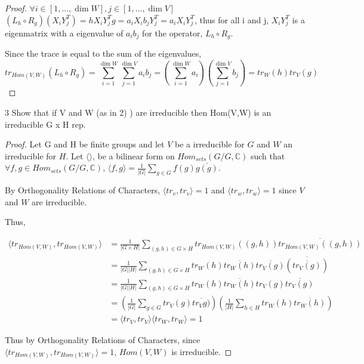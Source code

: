 \documentclass{article}
\newcommand{\C}{\mathbb{C}}
\newcommand{\angles}[1]{\langle #1 \rangle}
\begin{document}
\begin{proof}
    
    $\forall i \in [1, ..., \dim W] , j \in [1, \dots, \dim V]$ $(L_h \circ R_g)(X_i Y_j^T) = hX_iY_j^Tg = a_iX_ib_jY_j^T = a_iX_iY_j^T$, thus for all i and j, $X_iY_j^T$ is a eigenmatrix with a eigenvalue of $a_ib_j$ for the operator, $L_h \circ R_g$.
    
    Since the trace is equal to the sum of the eigenvalues, 
    \[
        tr_{Hom(V, W)}(L_h \circ R_g) = \sum_{i = 1}^{\dim W} \sum_{j = 1}^{\dim V} a_ib_j = \left(\sum_{i = 1}^{\dim W} a_i \right) \left(\sum_{j = 1}^{\dim V} b_j\right) = tr_W(h) tr_V(g)
    \]
\end{proof}

\bigskip

\begin{PROB}{3}\label{Problem 3.}
    Show that if V and W (as in 2) ) are irreducible then Hom(V,W) is an irreducible G x H rep.
\end{PROB}
\begin{proof}
    Let G and H be finite groups and let $V$ be a irreducible for $G$ and $W$ an irreducible for $H$. Let $\angles{}$, be a bilinear form on $Hom_{sets}(G / G, \C)$ such that $\forall f, g \in Hom_{sets}(G / G, \C)$, $\angles{f, g} = \frac{1}{|G|} \sum_{g \in G} f(g) \bar{g(g)}$.

    By Orthogonality Relations of Characters, $\angles{tr_v, tr_v} = 1$ and $\angles{tr_w, tr_w} = 1$ since $V$ and $W$ are irreducible. 

    Thus, 
    
    \begin{align*}
        \angles{tr_{Hom(V, W)}, tr_{Hom(V, W)}} &= \frac{1}{|G \times H|} \sum_{(g, h) \in G \times H} tr_{Hom(V, W)}((g, h)) \overline{tr_{Hom(V, W)}((g, h))} \\
        &= \frac{1}{|G||H|} \sum_{(g, h) \in G \times H} tr_W(h) \overline{tr_W(h)} \overline{tr_V(g)} \overline{(\overline{tr_V(g)})}\\
        &= \frac{1}{|G||H|} \sum_{(g, h) \in G \times H} tr_W(h) \overline{tr_W(h)} tr_V(g) \overline{tr_V(g)} \\
        &= \left(\frac{1}{|G|} \sum_{g \in G}  tr_V(g) \overline{tr_Vg)}\right)\left(\frac{1}{|H|} \sum_{h \in H}tr_W(h) \overline{tr_W(h)} \right) \\
        &= \angles{tr_V, tr_V} \angles{tr_W, tr_W} = 1
    \end{align*}

    Thus by Orthogonality Relations of Characters, since $\angles{tr_{Hom(V, W)}, tr_{Hom(V, W)}} = 1$, $Hom(V, W)$ is irreducible.   
\end{proof}
\end{document}

